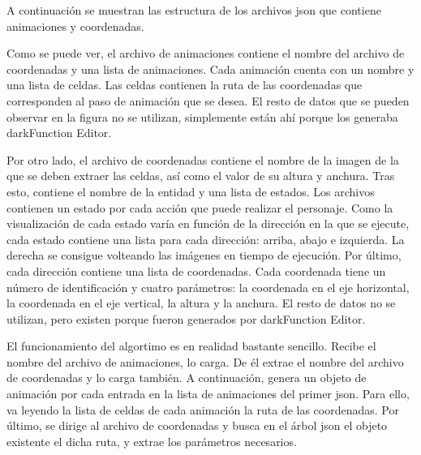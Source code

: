 		A continuación se muestran las estructura de los archivos \acrshort{json} que contiene animaciones y coordenadas.

		\begin{center}
		\begin{minipage}{.9\textwidth}
		\singlespace
		\begin{pyglist}[language=json, caption={Estructura de los archivos de animación en \acrshort{json}},
			label={alg:animjson}, listingname={Algoritmo}, numbers=left]
		
		\end{pyglist}
		\end{minipage}
		\end{center}

		Como se puede ver, el archivo de animaciones contiene el nombre del archivo de coordenadas y una lista de animaciones. Cada animación cuenta con un nombre y una lista de celdas. Las celdas contienen la ruta de las coordenadas que corresponden al paso de animación que se desea. El resto de datos que se pueden observar en la figura no se utilizan, simplemente están ahí porque los generaba darkFunction Editor.

		Por otro lado, el archivo de coordenadas contiene el nombre de la imagen de la que se deben extraer las celdas, así como el valor de su altura y anchura. Tras esto, contiene el nombre de la entidad y una lista de estados. Los archivos contienen un estado por cada acción que puede realizar el personaje. Como la visualización de cada estado varía en función de la dirección en la que se ejecute, cada estado contiene una lista para cada dirección: arriba, abajo e izquierda. La derecha se consigue volteando las imágenes en tiempo de ejecución. Por último, cada dirección contiene una lista de coordenadas. Cada coordenada tiene un número de identificación y cuatro parámetros: la coordenada en el eje horizontal, la coordenada en el eje vertical, la altura y la anchura. El resto de datos no se utilizan, pero existen porque fueron generados por darkFunction Editor.

		El funcionamiento del algortimo es en realidad bastante sencillo. Recibe el nombre del archivo de animaciones, lo carga. De él extrae el nombre del archivo de coordenadas y lo carga también. A continuación, genera un objeto de animación por cada entrada en la lista de animaciones del primer \acrshort{json}. Para ello, va leyendo la lista de celdas de cada animación la ruta de las coordenadas. Por último, se dirige al archivo de coordenadas y busca en el árbol \acrshort{json} el objeto existente el dicha ruta, y extrae los parámetros necesarios.

